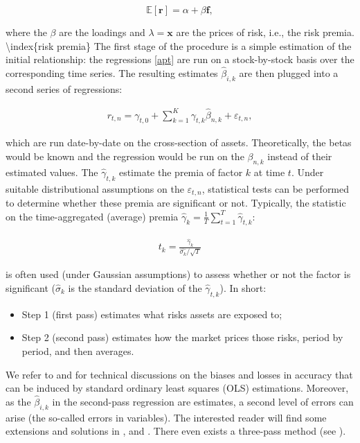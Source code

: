 \begin{equation}
\label{Er}
\mathbb{E}[\textbf{r}] = \alpha+\beta\mathbb{\textbf{f}},
\end{equation}

where the $\beta$ are the loadings and $\lambda = \mathbb{\textbf{x}}$ are the prices of risk, i.e., the risk premia. {\textbackslash}index\{risk premia\}
The first stage of the procedure is a simple estimation of the initial relationship: the regressions \ref{apt} are run on a stock-by-stock basis over the corresponding time series. The resulting estimates $\hat{\beta}_{i,k}$ are then plugged into a second series of regressions:

\begin{align*}
r_{t,n}= \gamma_{t,0} + \sum_{k=1}^K\gamma_{t,k}\hat{\beta}_{n,k} + \varepsilon_{t,n},
\end{align*}

which are run date-by-date on the cross-section of assets. Theoretically, the betas would be known and the regression would be run on the $\beta_{n,k}$ instead of their estimated values. The $\hat{\gamma}_{t,k}$ estimate the premia of factor $k$ at time $t$. Under suitable distributional assumptions on the $\varepsilon_{t,n}$, statistical tests can be performed to determine whether these premia are significant or not. Typically, the statistic on the time-aggregated (average) premia $\hat{\gamma}_k=\frac{1}{T}\sum_{t=1}^T\hat{\gamma}_{t,k}$:

\begin{align*}
t_k=\frac{\hat{\gamma}_k}{\hat{\sigma_k}/\sqrt{T}}
\end{align*}

is often used (under Gaussian assumptions) to assess whether or not the factor is significant ($\hat{\sigma}_k$ is the standard deviation of the $\hat{\gamma}_{t,k}$). In short:

\begin{itemize}
\item Step 1 (first pass) estimates what risks assets are exposed to;
\item Step 2 (second pass) estimates how the market prices those risks, period by period, and then averages.
\end{itemize}

We refer to \cite{jagannathan1998asymptotic} and \cite{petersen2009estimating} for technical discussions on the biases and losses in accuracy that can be induced by standard ordinary least squares (OLS) estimations. Moreover, as the $\hat\beta_{i,k}$ in the second-pass regression are estimates, a second level of errors can arise (the so-called errors in variables). The interested reader will find some extensions and solutions in \cite{shanken1992estimation}, \cite{ang2018using} and \cite{jegadeesh2019empirical}. There even exists a three-pass method (see \cite{giglio2018asset}).

